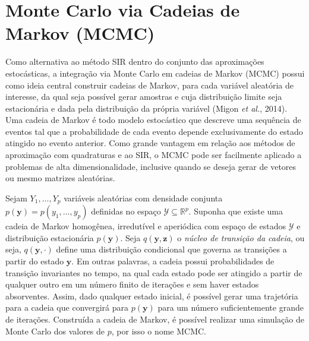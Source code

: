 \section{Monte Carlo via Cadeias de Markov (MCMC)}\label{mcmc}

Como alternativa ao método SIR dentro do conjunto das aproximações estocásticas, a integração via Monte Carlo em cadeias de Markov (MCMC) possui como ideia central construir cadeias de Markov, para cada variável aleatória de interesse, da qual seja possível gerar amostras e cuja distribuição limite seja estacionária e dada pela distribuição da própria variável (Migon \textit{et al.}, 2014)\cite{MiGaLou2014}. Uma cadeia de Markov é todo modelo estocástico que descreve uma sequência de eventos tal que a probabilidade de cada evento depende exclusivamente do estado atingido no evento anterior. Como grande vantagem em relação aos métodos de aproximação com quadraturas e ao SIR, o MCMC pode ser facilmente aplicado a problemas de alta dimensionalidade, inclusive quando se deseja gerar de vetores ou mesmo matrizes aleatórias.

Sejam $Y_1, \ldots, Y_p$ variáveis aleatórias com densidade conjunta $p(\bm{y}) = p(y_1, \ldots, y_p)$ definidas no espaço $\mathcal{Y} \subseteq \mathbb{R}^p$. Suponha que existe uma cadeia de Markov homogênea, irredutível e aperiódica com espaço de estados $\mathcal{Y}$ e distribuição estacionária $p(\bm{y})$. Seja $q(\bm{y}, \bm{z})$ o \textit{núcleo de transição da cadeia}, ou seja, $q(\bm{y}, \cdot)$ define uma distribuição condicional que governa as transições a partir do estado $\bm{y}$. Em outras palavras, a cadeia possui probabilidades de transição invariantes no tempo, na qual cada estado pode ser atingido a partir de qualquer outro em um número finito de iterações e sem haver estados absorventes. Assim, dado qualquer estado inicial, é possível gerar uma trajetória para a cadeia que convergirá para $p(\bm{y})$ para um número suficientemente grande de iterações. Construída a cadeia de Markov, é possível realizar uma simulação de Monte Carlo dos valores de $p$, por isso o nome MCMC.

